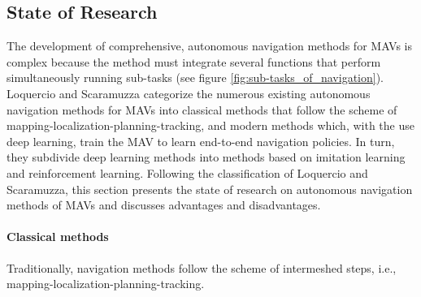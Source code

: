 \subsection{State of Research}

The development of comprehensive, autonomous navigation methods for MAVs is complex 
because the method must integrate several functions that perform simultaneously running sub-tasks (see figure \ref{fig:sub-tasks_of_navigation}).
Loquercio and Scaramuzza \cite{loquercio2018learning} categorize the numerous existing autonomous navigation methods for MAVs
into classical methods that follow the scheme of mapping-localization-planning-tracking,
and modern methods which, with the use deep learning, train the MAV to learn end-to-end navigation policies.
In turn, they subdivide deep learning methods into methods based on imitation learning and reinforcement learning.
Following the classification of Loquercio and Scaramuzza, 
this section presents the state of research on autonomous navigation methods of MAVs and discusses advantages and disadvantages.


%
%
%
%


\paragraph{Classical methods}

Traditionally, navigation methods follow the scheme of intermeshed steps, i.e., mapping-localization-planning-tracking.

